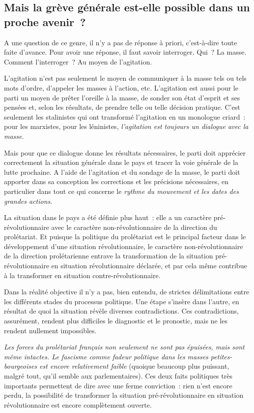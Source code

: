 \documentclass[french,twoside]{book} %
\begin{document}
 \subsection[{Mais la grève générale est-elle possible dans un proche avenir ?}]{Mais la grève générale est-elle possible dans un proche avenir ?}
\noindent A une question de ce genre, il n’y a pas de réponse à priori, c’est-à-dire toute faite d’avance. Pour avoir une réponse, il faut savoir interroger. Qui ? La masse. Comment l’interroger ? Au moyen de l’agitation.\par
L’agitation n’est pas seulement le moyen de communiquer à la masse tels ou tels mots d’ordre, d’appeler les masses à l’action, etc. L’agitation est aussi pour le parti un moyen de prêter l’oreille à la masse, de sonder son état d’esprit et ses pensées et, selon les résultats, de prendre telle ou telle décision pratique. C’est seulement les stalinistes qui ont transformé l’agitation en un monologue criard : pour les marxistes, pour les léninistes, \emph{l’agitation est toujours un dialogue avec la masse}.\par
Mais pour que ce dialogue donne les résultats nécessaires, le parti doit apprécier correctement la situation générale dans le pays et tracer la voie générale de la lutte prochaine. A l’aide de l’agitation et du sondage de la masse, le parti doit apporter dans sa conception les corrections et les précisions nécessaires, en particulier dans tout ce qui concerne le \emph{rythme du mouvement et les dates des grandes actions}.\par
La situation dans le pays a été définie plus haut : elle a un caractère pré-révolutionnaire avec le caractère non-révolutionnaire de la direction du prolétariat. Et puisque la politique du prolétariat est le principal facteur dans le développement d’une situation révolutionnaire, le caractère non-révolutionnaire de la direction prolétarienne entrave la transformation de la situation pré-révolutionnaire en situation révolutionnaire déclarée, et par cela même contribue à la transformer en situation contre-révolutionnaire.\par
Dans la réalité objective il n’y a pas, bien entendu, de strictes délimitations entre les différents stades du processus  politique. Une étape s’insère dans l’autre, en résultat de quoi la situation révèle diverses contradictions. Ces contradictions, assurément, rendent plus difficiles le diagnostic et le pronostic, mais ne les rendent nullement impossibles.\par
\emph{Les forces du prolétariat français non seulement ne sont pas épuisées, mais sont même intactes. Le fascisme comme fadeur politique dans les masses petites-bourgeoises est encore relativement faible} (quoique beaucoup plus puissant, malgré tout, qu’il semble aux parlementaires). Ces deux faits politiques très importants permettent de dire avec une ferme conviction : rien n’est encore perdu, la possibilité de transformer la situation pré-révolutionnaire en situation révolutionnaire est encore complètement ouverte.\par
\end{document}

